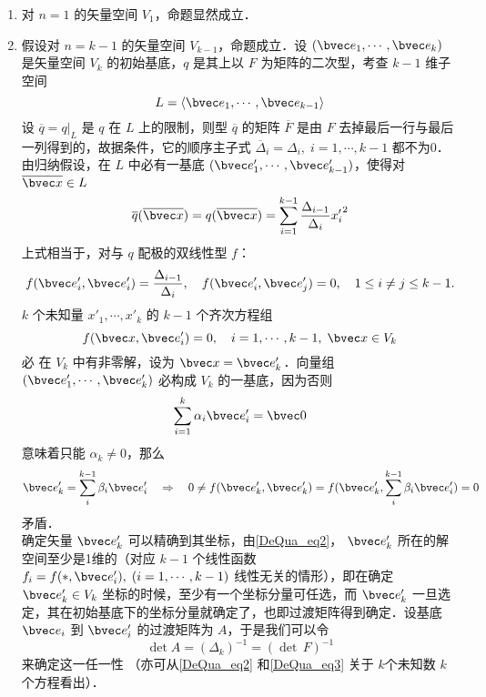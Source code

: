 \begin{enumerate}
\item 对 $n=1$ 的矢量空间 $V_1$，命题显然成立．
\item 假设对 $n=k-1$ 的矢量空间 $V_{k-1}$，命题成立．设 $(\bvec e_1,\cdots,\bvec e_k)$ 是矢量空间 $V_k$ 的初始基底，$q$ 是其上以 $F$ 为矩阵的二次型，考查 $k-1$ 维子空间
\begin{equation}
L=\langle\bvec e_1,\cdots,\bvec e_{k-1}\rangle
\end{equation}
设 $\overline q=q|_L$ 是 $q$ 在 $L$ 上的限制，则型 $\overline q$ 的矩阵 $\overline F$ 是由 $F$ 去掉最后一行与最后一列得到的，故据条件，它的顺序主子式 $\overline\Delta_i=\Delta_i,\;i=1,\cdots,k-1$ 都不为0．由归纳假设，在 $L$ 中必有一基底 $(\bvec e'_1,\cdots,\bvec e'_{k-1})$，使得对 $\overline{\bvec x}\in L$
\begin{equation}
\overline q(\overline{\bvec x})=q(\overline{\bvec x})=\sum_{i=1}^{k-1}\frac{\Delta_{i-1}}{\Delta_i}{x'_{i}}^2
\end{equation}
上式相当于，对与 $q$ 配极的双线性型 $f$：
\begin{equation}
f(\bvec e'_i,\bvec e'_i)=\frac{\Delta_{i-1}}{\Delta_{i}},\quad f(\bvec e'_i,\bvec e'_j)=0,\quad 1\leq i\neq j\leq k-1.
\end{equation}
 $k$ 个未知量 $x'_1,\cdots,x'_k$ 的 $k-1$ 个齐次方程组
 \begin{equation}\label{DeQua_eq2}
 f(\bvec x,\bvec e'_i)=0,\quad i=1,\cdots,k-1,\;\bvec x\in V_k
 \end{equation}
 必 在 $V_k$ 中有非零解，设为 $\bvec x=\bvec e'_k$．向量组 $(\bvec e'_1,\cdots,\bvec e'_k)$ 必构成 $V_k$ 的一基底，因为否则
 \begin{equation}
 \sum_{i=1}^k\alpha_i\bvec e'_i=\bvec 0
 \end{equation}
 意味着只能 $\alpha_k\neq0$，那么 
 \begin{equation}
 \bvec e'_k=\sum_i^{k-1}\beta_i\bvec e'_i\quad
 \Rightarrow\quad 0\neq f(\bvec e'_k,\bvec e'_k)=f(\bvec e'_k,\sum_i^{k-1}\beta_i\bvec e'_i)=0
 \end{equation}
 矛盾．\\

 确定矢量 $\bvec e'_k$ 可以精确到其坐标，由\autoref{DeQua_eq2}， $\bvec e'_k$ 所在的解空间至少是1维的（对应 $k-1$ 个线性函数 $f_i=f(*,\bvec e'_i),\;(i=1,\cdots,k-1)$ 线性无关的情形），即在确定 $\bvec e'_k\in V_k$ 坐标的时候，至少有一个坐标分量可任选，而 $\bvec e'_k$ 一旦选定，其在初始基底下的坐标分量就确定了，也即过渡矩阵得到确定．设基底 $\bvec e_i$ 到 $\bvec e'_i$ 的过渡矩阵为 $A$，于是我们可以令
 \begin{equation}\label{DeQua_eq3}
 \det A=(\Delta_k)^{-1}=(\det\,F)^{-1}
 \end{equation}
 来确定这一任一性 （亦可从\autoref{DeQua_eq2} 和\autoref{DeQua_eq3} 关于 $k$个未知数 $k$ 个方程看出）．


\end{enumerate}
